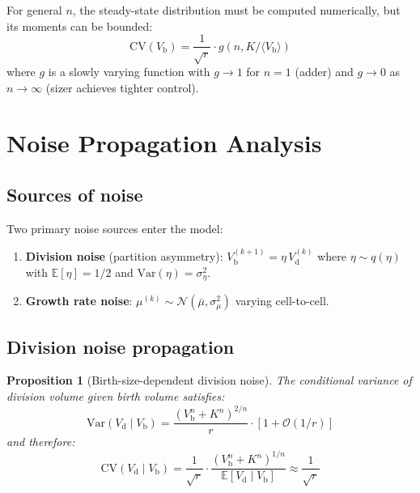 \documentclass[11pt]{article}
\newcommand{\Vb}{V_{\mathrm{b}}}
\newcommand{\Vd}{V_{\mathrm{d}}}
\newcommand{\CV}{\mathrm{CV}}
\newcommand{\E}{\mathbb{E}}
\newcommand{\Var}{\mathrm{Var}}
\newcommand{\Order}{\mathcal{O}}
\newtheorem{proposition}{Proposition}
\begin{document}
For general $n$, the steady-state distribution must be computed numerically, but its moments can be bounded:
\begin{equation}
  \CV(\Vb) = \frac{1}{\sqrt{r}}\cdot g(n, K/\langle\Vb\rangle)
\end{equation}
where $g$ is a slowly varying function with $g \to 1$ for $n = 1$ (adder) and $g \to 0$ as $n \to \infty$ (sizer achieves tighter control).

\section{Noise Propagation Analysis}

\subsection{Sources of noise}

Two primary noise sources enter the model:
\begin{enumerate}
  \item \textbf{Division noise} (partition asymmetry): $\Vb^{(k+1)} = \eta\, \Vd^{(k)}$ where $\eta \sim q(\eta)$ with $\E[\eta] = 1/2$ and $\Var(\eta) = \sigma_\eta^2$.
  \item \textbf{Growth rate noise}: $\mu^{(k)} \sim \mathcal{N}(\bar\mu, \sigma_\mu^2)$ varying cell-to-cell.
\end{enumerate}

\subsection{Division noise propagation}

\begin{proposition}[Birth-size-dependent division noise]
The conditional variance of division volume given birth volume satisfies:
\begin{equation}
  \boxed{\Var(\Vd \mid \Vb) = \frac{(\Vb^n + K^n)^{2/n}}{r}\cdot\left[1 + \Order(1/r)\right]}
\end{equation}
and therefore:
\begin{equation}
  \CV(\Vd \mid \Vb) = \frac{1}{\sqrt{r}}\cdot\frac{(\Vb^n + K^n)^{1/n}}{\E[\Vd \mid \Vb]} \approx \frac{1}{\sqrt{r}}
\end{equation}
\end{proposition}
\end{document}
